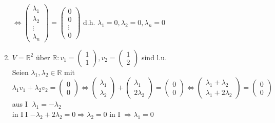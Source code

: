 \documentclass[a4paper,11pt]{article}
\begin{document}
\begin{enumerate}[label=\alph*)]
$\Leftrightarrow\begin{pmatrix}\lambda_1\\\lambda_2\\\vdots\\\lambda_n\end{pmatrix}=\begin{pmatrix}0\\0\\\vdots\\0\end{pmatrix}$ d.h. $\lambda_1=0,\lambda_2=0,\lambda_n=0$
\item $V=\mathbb{R}^2$ über $\mathbb{R}\colon v_1=\begin{pmatrix}1\\1\end{pmatrix}, v_2=\begin{pmatrix}1\\2\end{pmatrix}$ sind l.u. \\
Seien $\lambda_1,\lambda_2\in\mathbb{R}$ mit $\lambda_1v_1+\lambda_2v_2=\begin{pmatrix}0\\0\end{pmatrix}\Leftrightarrow\begin{pmatrix}\lambda_1\\\lambda_2\end{pmatrix}+\begin{pmatrix}\lambda_1\\2\lambda_2\end{pmatrix}=\begin{pmatrix}0\\0\end{pmatrix}\Leftrightarrow\begin{pmatrix}\lambda_1+\lambda_2\\\lambda_1+2\lambda_2\end{pmatrix}=\begin{pmatrix}0\\0\end{pmatrix}$ \\
aus \textcircled{I} $\lambda_1=-\lambda_2$ \\
in \textcircled{II} $-\lambda_2+2\lambda_2=0\Rightarrow\lambda_2=0$\hspace{5mm} in \textcircled{I}$\Rightarrow\lambda_1=0$

\end{enumerate}
\end{document}
